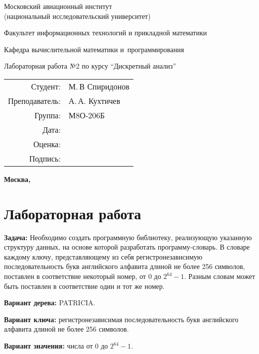 \documentclass[pdf, unicode, 12pt, a4paper,oneside,fleqn]{article}
\newcommand{\CWHeader}[1]{\section*{#1}}
\newcommand{\CWProblem}[1]{\par\textbf{Задача: }#1}
\begin{document}
\begin{center}
\bfseries

{\Large Московский авиационный институт\\ (национальный исследовательский университет)

}

\vspace{48pt}

{\large Факультет информационных технологий и прикладной математики
}

\vspace{36pt}


{\large Кафедра вычислительной математики и~программирования

}


\vspace{48pt}

Лабораторная работа №2 по курсу \enquote{Дискретный анализ}

\end{center}

\vspace{72pt}

\begin{flushright}
\begin{tabular}{rl}
Студент: & М.\,В Спиридонов \\
Преподаватель: & А.\,А. Кухтичев \\
Группа: & М8О-206Б \\
Дата: & \\	
Оценка: & \\
Подпись: & \\
\end{tabular}
\end{flushright}

\vfill
\setcounter{page}{0}
\pagestyle{empty}
\begin{center}
\bfseries
Москва, \the\year
\end{center}
\pagebreak

\CWHeader{Лабораторная работа }

\CWProblem{ 
Необходимо создать программную библиотеку, реализующую указанную структуру данных, на основе которой разработать программу-словарь. В словаре каждому ключу, представляющему из себя регистронезависимую последовательность букв английского алфавита длиной не более 256 символов, поставлен в соответствие некоторый номер, от 0 до $2^{64} - 1$. Разным словам может быть поставлен в соответствие один и тот же номер.

{\bfseries Вариант дерева:} { PATRICIA.}

{\bfseries Вариант ключа:} { регистронезависимая последовательность букв английского алфавита длиной не более 256 символов. }

{\bfseries Вариант значения:} { числа от 0 до $2^{64} - 1$.}
}
\pagestyle{plain}
\pagebreak
\end{document}
